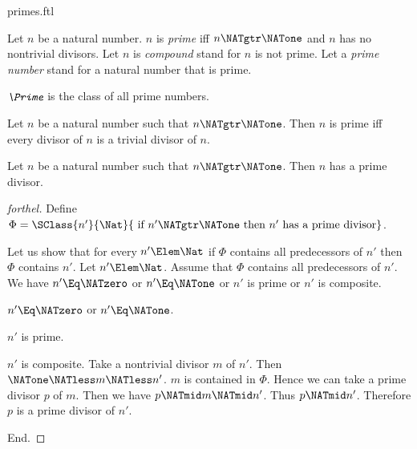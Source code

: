 \documentclass{stex}
\begin{document}
\begin{smodule}{primes.ftl}

\begin{definition}[forthel,for={prime,compound,prime number}]
  Let $n$ be a natural number.
  $n$ is \emph{prime} iff $n \NATgtr \NATone$ and $n$ has no nontrivial divisors.
  Let $n$ is \emph{compound} stand for $n$ is not prime.
  Let a \emph{prime number} stand for a natural number that is prime.
\end{definition}

\begin{definition}[forthel,for=Prime]
  $\emph{\Prime}$ is the class of all prime numbers.
\end{definition}

\begin{proposition}[forthel]
  Let $n$ be a natural number such that $n \NATgtr \NATone$.
  Then $n$ is prime iff every divisor of $n$ is a trivial divisor of $n$.
\end{proposition}

\begin{proposition}[forthel]
  Let $n$ be a natural number such that $n \NATgtr \NATone$.
  Then $n$ has a prime divisor.
\end{proposition}
\begin{proof}[forthel]
  Define $\Phi = \SClass{n'}{\Nat}{\text{ if }n' \NATgtr \NATone\text{ then }n'\text{ has a prime divisor}}$.

  Let us show that for every $n' \Elem \Nat$ if $\Phi$ contains all
  predecessors of $n'$ then $\Phi$ contains $n'$.
    Let $n' \Elem \Nat$.
    Assume that $\Phi$ contains all predecessors of $n'$.
    We have $n' \Eq \NATzero$ or $n' \Eq \NATone$ or $n'$ is prime or $n'$ is composite.

    \begin{case}{$n' \Eq \NATzero$ or $n' \Eq \NATone$.} \end{case}

    \begin{case}{$n'$ is prime.} \end{case}

    \begin{case}{$n'$ is composite.}
      Take a nontrivial divisor $m$ of $n'$.
      Then $\NATone \NATless m \NATless n'$.
      $m$ is contained in $\Phi$.
      Hence we can take a prime divisor $p$ of $m$.
      Then we have $p \NATmid m \NATmid n'$.
      Thus $p \NATmid n'$.
      Therefore $p$ is a prime divisor of $n'$.
    \end{case}
  End.


\end{proof}
\end{smodule}
\end{document}
